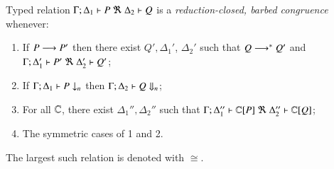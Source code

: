 \documentclass[runningheads]{llncs}
\begin{document}

\begin{definition}
\label{def:rc}
	Typed relation
	$\horel{\Gamma}{\Delta_1}{P}{\ \Re\ }{\Delta_2}{Q}$
	is a {\em reduction-closed, barbed congruence} whenever:
	\begin{enumerate}[1.]
		\item	If $P \longrightarrow P'$ then there exist $Q', \Delta_1'$,  $\Delta_2'$ such that $Q \longrightarrow^* Q'$ and
			$\horel{\Gamma}{\Delta_1'}{P'}{\ \Re\ }{\Delta_2'}{Q'}$; 

			\item	If $\Gamma;\Delta_1 \vdash P \downarrow_{n}$ then $\Gamma;\Delta_2 \vdash Q \Downarrow_{n}$; %


		\item	For all ${\mathbb{C}}$, there exist $\Delta_1'',\Delta_2''$ such that  $\horel{\Gamma}{\Delta_1''}{\context{\C}{P}}{\ \Re\ }{\Delta_2''}{\context{\C}{Q}}$;
		                      \item	The symmetric cases of 1 and 2.                
	\end{enumerate}
	The largest such relation is denoted with $\cong$.
\end{definition}
\end{document}
